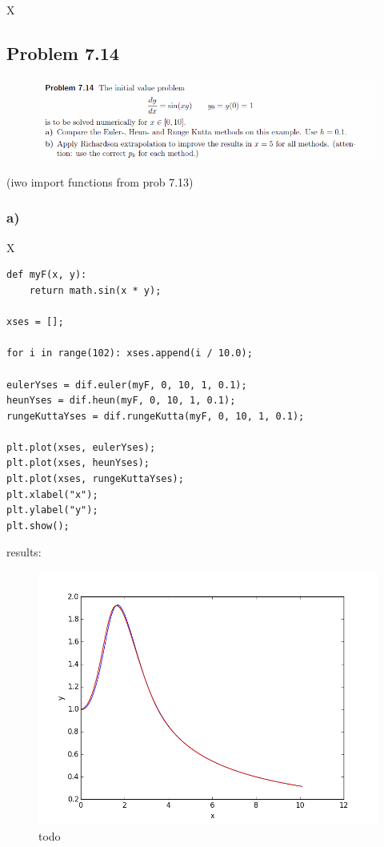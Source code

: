 X




\subsection{Problem 7.14}


\begin{figure}[!ht]
\includegraphics[width=1\textwidth]{chapters/images/desc-7-14}
\end{figure}

(iwo import functions from prob 7.13)

\subsubsection{a)}

X

\begin{lstlisting}[caption=todo]
def myF(x, y):
	return math.sin(x * y);

xses = [];

for i in range(102): xses.append(i / 10.0);

eulerYses = dif.euler(myF, 0, 10, 1, 0.1);
heunYses = dif.heun(myF, 0, 10, 1, 0.1);
rungeKuttaYses = dif.rungeKutta(myF, 0, 10, 1, 0.1);

plt.plot(xses, eulerYses);
plt.plot(xses, heunYses);
plt.plot(xses, rungeKuttaYses);
plt.xlabel("x");
plt.ylabel("y");
plt.show();
\end{lstlisting}


results:

\begin{figure}[!ht]
\includegraphics[width=1\textwidth]{chapters/images/figure-7-14-a}
\caption{todo}
\end{figure}



